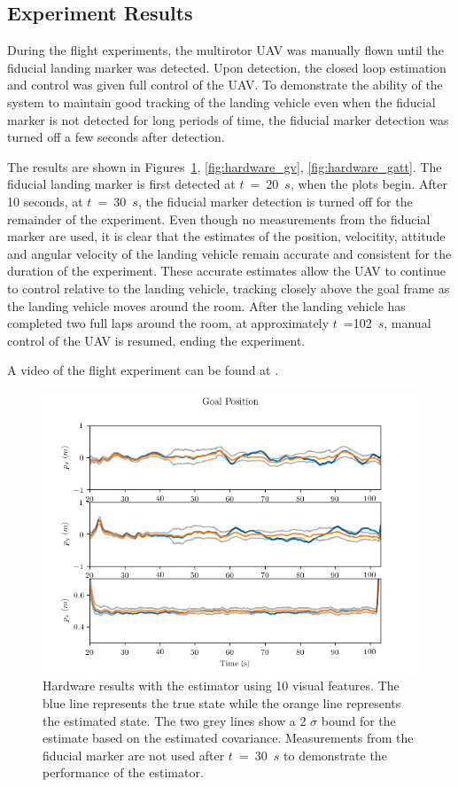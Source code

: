 
\subsection{Experiment Results}
During the flight experiments, the multirotor UAV was manually flown until the
fiducial landing marker was detected. Upon detection, the closed loop estimation
and control was given full control of the UAV. To demonstrate the ability of the
system to maintain good tracking of the landing vehicle even when the fiducial
marker is not detected for long periods of time, the fiducial marker detection
was turned off a few seconds after detection.

The results are shown in Figures~\ref{fig:hardware_gp}, \ref{fig:hardware_gv},
\ref{fig:hardware_gatt}. The fiducial landing marker is first detected at
$t$~=~20~$s$, when the plots begin. After 10 seconds, at $t$~=~30~$s$, the
fiducial marker detection is turned off for the remainder of the experiment.
Even though no measurements from the fiducial marker are used, it is clear that
the estimates of the position, velocitity, attitude and angular velocity of the
landing vehicle remain accurate and consistent for the duration of the
experiment. These accurate estimates allow
the UAV to continue to control relative to the landing vehicle, tracking closely
above the goal frame as the landing vehicle moves around the room. After the
landing vehicle has completed two full laps around the room,
at approximately $t$~=102~$s$, manual control of the UAV is resumed, ending the experiment.

A video of the flight experiment can be found at .

\begin{figure}
  \centering
  \includegraphics[scale=0.5]{plots/hardware_gp.png}
  \caption{Hardware results with the estimator using 10 visual
  features. The blue line represents the true state while the orange line
  represents the estimated state. The two grey lines show a 2 $\sigma$ bound for
  the estimate based on the estimated covariance. Measurements from the fiducial
  marker are not used after $t$~=~30~$s$ to demonstrate the performance of the estimator.}
  \label{fig:hardware_gp}
\end{figure}

